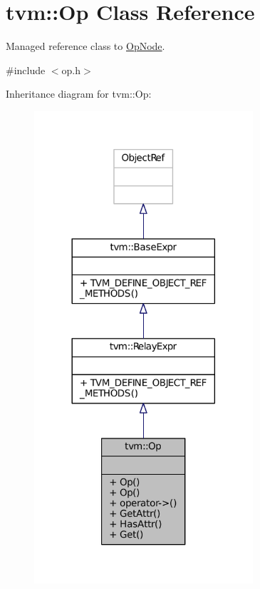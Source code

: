 \hypertarget{classtvm_1_1Op}{}\section{tvm\+:\+:Op Class Reference}
\label{classtvm_1_1Op}


Managed reference class to \hyperlink{classtvm_1_1OpNode}{Op\+Node}.  




{\ttfamily \#include $<$op.\+h$>$}



Inheritance diagram for tvm\+:\+:Op\+:
\nopagebreak
\begin{figure}[H]
\begin{center}
\leavevmode
\includegraphics[width=230pt]{classtvm_1_1Op__inherit__graph}
\end{center}
\end{figure}


